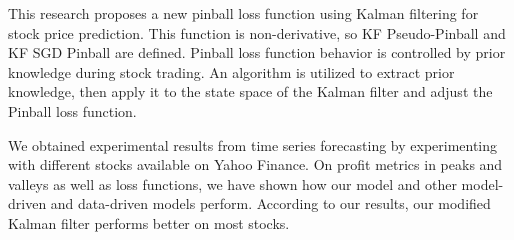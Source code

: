 \documentclass[12pt,a4paper]{article}
\begin{document}
	This research proposes a new pinball loss function using Kalman filtering for stock price prediction. This function is non-derivative, so KF Pseudo-Pinball and KF SGD Pinball are defined. Pinball loss function behavior is controlled by prior knowledge during stock trading. An algorithm is utilized to extract prior knowledge, then apply it to the state space of the Kalman filter and adjust the Pinball loss function.
	
	We obtained experimental results from time series forecasting by experimenting with different stocks available on Yahoo Finance. On profit metrics in peaks and valleys as well as loss functions, we have shown how our model and other model-driven and data-driven models perform. According to our results, our modified Kalman filter performs better on most stocks.
	
\end{document}
